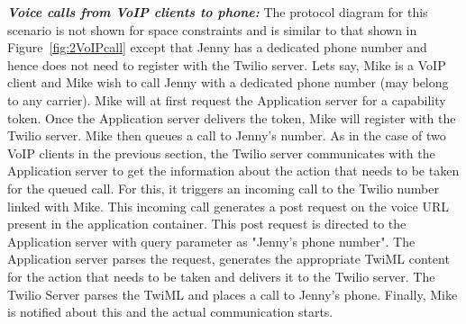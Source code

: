 \emph{\textbf{Voice calls from VoIP clients to phone:} }
The protocol diagram for this scenario is not shown for space constraints and is similar to that shown in Figure~\ref{fig:2VoIPcall} except that Jenny has a dedicated phone number and hence does not need to register with the Twilio server. Lets say, Mike is a VoIP client and Mike wish to call Jenny with a dedicated phone number (may belong to any carrier). Mike will at first request the Application server for a capability token. Once the Application server delivers the token, Mike will register with the Twilio server. Mike then queues a call to Jenny's number. As in the case of two VoIP clients in the previous section, the Twilio server communicates with the Application server to get the information about the action that needs to be taken for the queued call. For this, it triggers an incoming call to the Twilio number linked with Mike. This incoming call generates a post request on the voice URL present in the application container. This post request is directed to the Application server with query parameter as "Jenny's phone number". The Application server parses the request, generates the appropriate TwiML content for the action that needs to be taken and delivers it to the Twilio server. The Twilio Server parses the TwiML and places a call to Jenny's phone. Finally, Mike is notified about this and the actual communication starts. 
 
